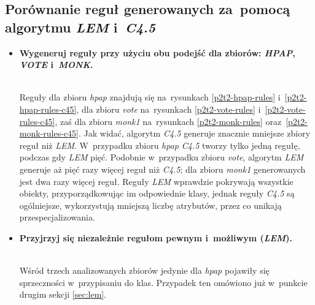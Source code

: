 \subsection{Porównanie reguł generowanych za~pomocą algorytmu \emph{LEM} i~\emph{C4.5}}

\begin{itemize}
\item \textbf{Wygeneruj reguły przy użyciu obu podejść dla zbiorów: \emph{HPAP}, \emph{VOTE} i~\emph{MONK}.}

	
	
	
	
	
	
	\\Reguły dla zbioru \emph{hpap} znajdują się na~rysunkach \ref{p2t2-hpap-rules} i~\ref{p2t2-hpap-rules-c45}, dla zbioru \emph{vote} na~rysunkach \ref{p2t2-vote-rules} i~\ref{p2t2-vote-rules-c45}, zaś dla zbioru \emph{monk1} na~rysunkach \ref{p2t2-monk-rules} oraz~\ref{p2t2-monk-rules-c45}. Jak widać, algorytm \emph{C4.5} generuje znacznie mniejsze zbiory reguł niż \emph{LEM}. W~przypadku zbioru \emph{hpap} \emph{C4.5} tworzy tylko jedną regułę, podczas gdy \emph{LEM} pięć. Podobnie w~przypadku zbioru \emph{vote}, algorytm \emph{LEM} generuje aż pięć razy więcej reguł niż \emph{C4.5}; dla zbioru \emph{monk1} generowanych jest dwa razy więcej reguł. Reguły \emph{LEM} wprawdzie pokrywają wszystkie obiekty, przyporządkowując im odpowiednie klasy, jednak reguły \emph{C4.5} są ogólniejsze, wykorzystują mniejszą liczbę atrybutów, przez co unikają przespecjalizowania.

\item \textbf{Przyjrzyj się niezależnie regułom pewnym i~możliwym (\emph{LEM}).}

	\\Wśród trzech analizowanych zbiorów jedynie dla \emph{hpap} pojawiły się sprzeczności w~przypisaniu do klas. Przypadek ten omówiono już w~punkcie drugim sekcji \ref{sec:lem}.
\end{itemize}

